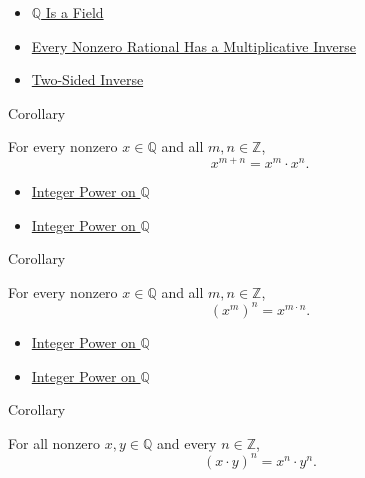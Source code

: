 \begin{dependencies}
\begin{itemize}
  \item \hyperref[thm:q-is-a-field]{$\mathbb{Q}$ Is a Field}
  \item \hyperref[thm:every-nonzero-rational-has-multiplicative-inverse]{Every Nonzero Rational Has a Multiplicative Inverse}
  \item \hyperref[def:two-sided-inverse]{Two-Sided Inverse}
\end{itemize}
\end{dependencies}

\begin{corollarybox}{Corollary}
\begin{corollary}
\label{cor:exponent-addition-on-q}
For every nonzero $x\in\mathbb{Q}$ and all $m,n\in\mathbb{Z}$,
\[
x^{m+n}=x^m\cdot x^n.
\]
\end{corollary}
\end{corollarybox}

\begin{dependencies}
\begin{itemize}
  \item \hyperref[def:integer-power-on-q]{Integer Power on $\mathbb{Q}$}
  \item \hyperref[def:integer-power-on-q]{Integer Power on $\mathbb{Q}$}
\end{itemize}
\end{dependencies}

\begin{corollarybox}{Corollary}
\begin{corollary}
\label{cor:power-of-power-on-q}
For every nonzero $x\in\mathbb{Q}$ and all $m,n\in\mathbb{Z}$,
\[
(x^m)^n=x^{m\cdot n}.
\]
\end{corollary}
\end{corollarybox}

\begin{dependencies}
\begin{itemize}
  \item \hyperref[def:integer-power-on-q]{Integer Power on $\mathbb{Q}$}
  \item \hyperref[def:integer-power-on-q]{Integer Power on $\mathbb{Q}$}
\end{itemize}
\end{dependencies}

\begin{corollarybox}{Corollary}
\begin{corollary}
\label{cor:power-of-product-on-q}
For all nonzero $x,y\in\mathbb{Q}$ and every $n\in\mathbb{Z}$,
\[
(x\cdot y)^n=x^n\cdot y^n.
\]
\end{corollary}
\end{corollarybox}

